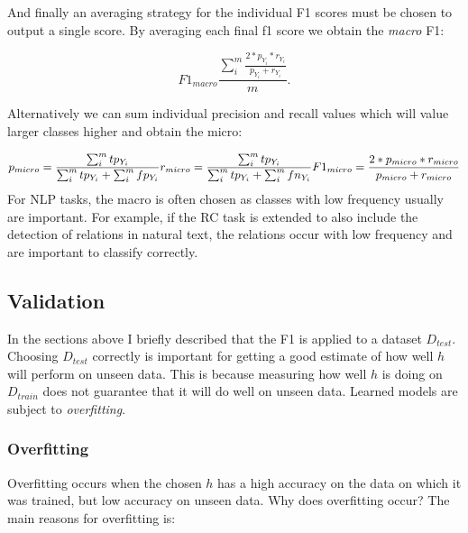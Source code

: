\begin{center}
\end{center}

And finally an averaging strategy for the individual F1 scores must be chosen to output a single score. By averaging each final f1 score we obtain the \emph{macro} F1: 

$$ 
F1_{macro} \frac{\sum_{i}^{m} \frac{2 * p_{Y_i} * r_{Y_i}}{p_{Y_i} + r_{Y_i}}}{m}. 
$$

Alternatively we can sum individual precision and recall values which will value larger classes higher and obtain the micro:

$$
p_{micro} = \frac{\sum_{i}^{m} tp_{Y_i} } {\sum_{i}^{m} tp_{Y_i}+\sum_{i}^{m} fp_{Y_i}} \\
r_{micro} = \frac{\sum_{i}^{m} tp_{Y_i} } {\sum_{i}^{m} tp_{Y_i}+\sum_{i}^{m} fn_{Y_i}} \\
F1_{micro} = \frac{2 * p_{micro} * r_{micro}}{p_{micro} + r_{micro}} \\
$$
For NLP tasks, the macro is often chosen as classes with low frequency usually are important. For example, if the RC task is extended to also include the detection of relations in natural text, the relations occur with low frequency and are important to classify correctly.

\subsection{Validation}
\label{sec:validation}

In the sections above I briefly described that the F1 is applied to a dataset $D_{test}$. Choosing $D_{test}$ correctly is important for getting a good estimate of how well $h$ will perform on unseen data. This is because measuring how well $h$ is doing on $D_{train}$ does not guarantee that it will do well on unseen data. Learned models are subject to \emph{overfitting}. 
\subsubsection{Overfitting}
Overfitting occurs when the chosen $h$ has a high accuracy on the data on which it was trained, but low accuracy on unseen data. Why does overfitting occur? The main reasons for overfitting is:

